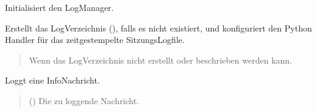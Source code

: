 \documentclass[letterpaper,10pt,english]{sphinxmanual}
\begin{document}
\begin{fulllineitems}
\begin{fulllineitems}
\begin{quote}
\begin{description}
\end{description}\end{quote}

\end{fulllineitems}


\begin{fulllineitems}
\label{\detokenize{modulab/log_manager:modules.log.LogManager.LogManager.__init__}}
\pysigstartsignatures
\pysiglinewithargsret
{}
{}
{}
\pysigstopsignatures
\sphinxAtStartPar
Initialisiert den LogManager.

\sphinxAtStartPar
Erstellt das Log\sphinxhyphen{}Verzeichnis (), falls es nicht existiert,
und konfiguriert den Python \sphinxhyphen{}Handler für das
zeitgestempelte Sitzungs\sphinxhyphen{}Logfile.
\begin{quote}\begin{description}
\sphinxAtStartPar
{} \textendash{} Wenn das Log\sphinxhyphen{}Verzeichnis nicht erstellt oder
    beschrieben werden kann.

\end{description}\end{quote}

\end{fulllineitems}


\begin{fulllineitems}
\label{\detokenize{modulab/log_manager:modules.log.LogManager.LogManager.info}}
\pysigstartsignatures
\pysiglinewithargsret
{}
{}
{}
\pysigstopsignatures
\sphinxAtStartPar
Loggt eine Info\sphinxhyphen{}Nachricht.
\begin{quote}\begin{description}
\sphinxAtStartPar
{} () \textendash{} Die zu loggende Nachricht.

\end{description}\end{quote}


\end{fulllineitems}
\end{fulllineitems}
\end{document}
